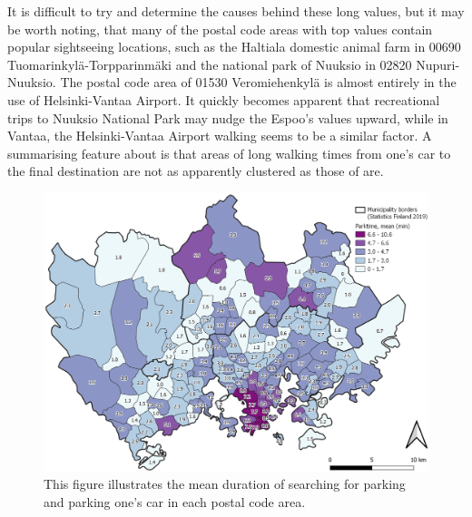 It is difficult to try and determine the causes behind these long  values, but it may be worth noting, that many of the postal code areas with top values contain popular sightseeing locations, such as the Haltiala domestic animal farm in 00690 Tuomarinkylä-Torpparinmäki and the national park of Nuuksio in 02820 Nupuri-Nuuksio. The postal code area of 01530 Veromiehenkylä is almost entirely in the use of Helsinki-Vantaa Airport. It quickly becomes apparent that recreational trips to Nuuksio National Park may nudge the Espoo's  values upward, while in Vantaa, the Helsinki-Vantaa Airport walking seems to be a similar factor. A summarising feature about  is that areas of long walking times from one's car to the final destination are not as apparently clustered as those of  are.


\begin{figure}[H]%
    \centering
    \includegraphics[width=\textwidth]{images/thesis_postalvis_parkmean.png}
    \caption[Parktime, mean, in the reseach area]{This figure illustrates the mean duration of searching for parking and parking one's car in each postal code area.}%
    \label{fig:postalvis_parkmean}%
\end{figure}

